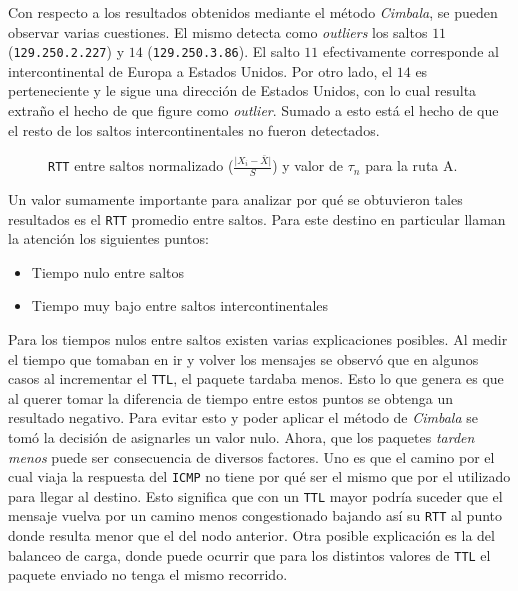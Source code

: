 Con respecto a los resultados obtenidos mediante el método \emph{Cimbala}, se
pueden observar varias cuestiones. El mismo detecta como \emph{outliers} los
saltos $11$ (\texttt{129.250.2.227}) y $14$ (\texttt{129.250.3.86}). El salto
$11$ efectivamente corresponde al intercontinental de Europa a Estados Unidos.
Por otro lado, el $14$ es perteneciente y le sigue una dirección de Estados Unidos,
con lo cual resulta extraño el hecho de que figure como \emph{outlier}. Sumado a
esto está el hecho de que el resto de los saltos intercontinentales no fueron
detectados.

\begin{figure}[H]
    \caption{\texttt{RTT} entre saltos normalizado ($\frac{\vert X_i-\bar{X}\vert}{S}$)
    y valor de $\tau_n$ para la ruta A.}
    \label{res:escA:rttnorm}
\end{figure}

Un valor sumamente importante para analizar por qué se obtuvieron tales
resultados es el \texttt{RTT} promedio entre saltos. Para este destino en
particular llaman la atención los siguientes puntos:

\begin{itemize}
    \item Tiempo nulo entre saltos
    \item Tiempo muy bajo entre saltos intercontinentales
\end{itemize}

Para los tiempos nulos entre saltos existen varias explicaciones posibles. Al
medir el tiempo que tomaban en ir y volver los mensajes se observó que en
algunos casos al incrementar el \texttt{TTL}, el paquete tardaba menos. Esto lo
que genera es que al querer tomar la diferencia de tiempo entre estos puntos se
obtenga un resultado negativo. Para evitar esto y poder aplicar el método de
\emph{Cimbala} se tomó la decisión de asignarles un valor nulo. Ahora, que los
paquetes \emph{tarden menos} puede ser consecuencia de diversos factores. Uno es
que el camino por el cual viaja la respuesta del \texttt{ICMP} no tiene por qué
ser el mismo que por el utilizado para llegar al destino.  Esto significa que con un
\texttt{TTL} mayor podría suceder que el mensaje vuelva por un camino menos
congestionado bajando así su \texttt{RTT} al punto donde resulta menor que el
del nodo anterior. Otra posible explicación es la del balanceo de carga, donde
puede ocurrir que para los distintos valores de \texttt{TTL} el paquete enviado
no tenga el mismo recorrido.

